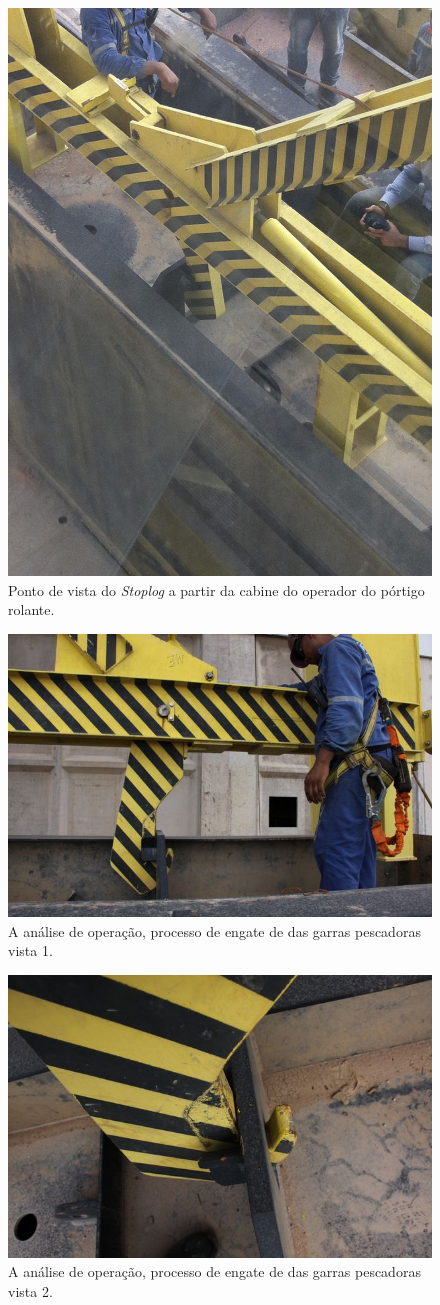 \begin{figure}[h!]
    \centering \includegraphics[width=0.5\columnwidth]{figs/jirau/jirau_19}
    \caption{Ponto de vista do \emph{Stoplog} a partir da cabine do operador do pórtigo rolante.}
    \label{fig:jirau19}
\end{figure}

\begin{figure}[h!]
    \centering \includegraphics[width=0.6\columnwidth]{figs/jirau/jirau_20}
    \caption{A análise de operação, processo de engate de das garras pescadoras vista 1.}
    \label{fig:jirau20}
\end{figure}

\begin{figure}[h!]
    \centering \includegraphics[width=0.6\columnwidth]{figs/jirau/jirau_21}
    \caption{A análise de operação, processo de engate de das garras pescadoras vista 2.}
    \label{fig:jirau21}
\end{figure}

